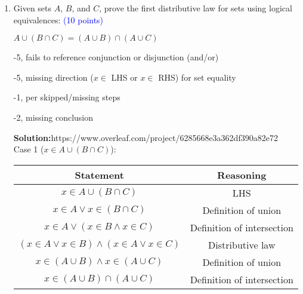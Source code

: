 \documentclass{article}
\newcommand{\pt}[1]{\textcolor{blue}{(#1 points)}}
\newenvironment{solution}
{
\par
\color{blue}
\textbf{Solution:}https://www.overleaf.com/project/6285668e3a362df390a82e72
}
{
\par
}
\newenvironment{rubric}
{
\par
\begin{spacing}{.6}
\begin{itshape}
\color{red}

}
{
\end{itshape}
\end{spacing}
\par
}
\begin{document}
\begin{enumerate}
\begin{rubric}
-3, AON
\end{rubric}

\begin{solution}
\begin{enumerate}
    \item F
    \item F
    \item T
    \item T
    \item F
\end{enumerate}
\end{solution}

\item Given sets $A$, $B$, and $C$, prove the first distributive law for sets using logical equivalences:   \pt{10}
\begin{center}
    $A \cup (B \cap C) = (A \cup B) \cap (A \cup C)$
\end{center}

\begin{rubric}
-5, fails to reference conjunction or disjunction (and/or)

-5, missing direction ($x \in $ LHS or $x \in $ RHS) for set equality

-1, per skipped/missing steps

-2, missing conclusion

\end{rubric}

\begin{solution}\\
Case 1 ($x \in A \cup (B \cap C)$):\\
\begin{tabular}{c|c}
    Statement & Reasoning \\
    \hline
    $x \in A \cup (B \cap C)$ & LHS \\
    $x \in A \lor x \in (B \cap C)$ & Definition of union \\
    $x \in A \lor (x \in B \land x \in C)$ & Definition of intersection \\
    $(x \in A \lor x \in B) \land (x \in A \lor x \in C)$ & Distributive law \\
    $x \in (A \cup B) \land x \in (A \cup C)$ & Definition of union \\
    $x \in (A \cup B) \cap (A \cup C)$ & Definition of intersection \\
    

\end{tabular}
\end{solution}
\end{enumerate}
\end{document}
